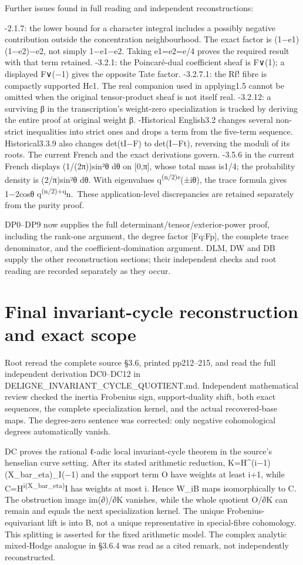 \documentclass[
]{report}
\begin{document}
Further issues found in full reading and independent reconstructions:

-2.1.7: the lower bound for a character integral includes a possibly
negative contribution outside the concentration neighbourhood. The exact
factor is (1−e1)(1−e2)−e2, not simply 1−e1−e2. Taking e1=e2=e/4 proves
the required result with that term retained. -3.2.1: the Poincaré-dual
coefficient sheaf is F∨(1); a displayed F∨(−1) gives the opposite Tate
factor. -3.2.7.1: the Rf! fibre is compactly supported Hc1. The real
companion used in applying1.5 cannot be omitted when the original
tensor-product sheaf is not itself real. -3.2.12: a surviving β in the
transcription's weight-zero specialization is tracked by deriving the
entire proof at original weight β. -Historical English3.2 changes
several non-strict inequalities into strict ones and drops a term from
the five-term sequence. Historical3.3.9 also changes det(tI−F) to
det(I−Ft), reversing the moduli of its roots. The current French and the
exact derivations govern. -3.5.6 in the current French displays
(1/(2π))sin²θ dθ on {[}0,π{]}, whose total mass is1/4; the probability
density is (2/π)sin²θ dθ. With eigenvalues
q\textsuperscript{(n/2)e}(±iθ), the trace formula gives 1−2cosθ
q\textsuperscript{(n/2)+q}n.~These application-level discrepancies are
retained separately from the purity proof.

DP0--DP9 now supplies the full determinant/tensor/exterior-power proof,
including the rank-one argument, the degree factor {[}Fq:Fp{]}, the
complete trace denominator, and the coefficient-domination argument.
DLM, DW and DB supply the other reconstruction sections; their
independent checks and root reading are recorded separately as they
occur.

\section{Final invariant-cycle reconstruction and exact
scope}\label{final-invariant-cycle-reconstruction-and-exact-scope}

Root reread the complete source §3.6, printed pp212--215, and read the
full independent derivation DC0--DC12 in
DELIGNE\_INVARIANT\_CYCLE\_QUOTIENT.md. Independent mathematical review
checked the inertia Frobenius sign, support-duality shift, both exact
sequences, the complete specialization kernel, and the actual
recovered-base maps. The degree-zero sentence was corrected: only
negative cohomological degrees automatically vanish.

DC proves the rational ℓ-adic local invariant-cycle theorem in the
source's henselian curve setting. After its stated arithmetic reduction,
K=H\^{}(i−1)(X\_bar\_eta)\_I(−1) and the support term O have weights at
least i+1, while C=H\textsuperscript{i(X\_bar\_eta)}I has weights at
most i. Hence W\_iB maps isomorphically to C. The obstruction image
im(∂)/∂K vanishes, while the whole quotient O/∂K can remain and equals
the next specialization kernel. The unique Frobenius-equivariant lift is
into B, not a unique representative in special-fibre cohomology. This
splitting is asserted for the fixed arithmetic model. The complex
analytic mixed-Hodge analogue in §3.6.4 was read as a cited remark, not
independently reconstructed.
\end{document}
